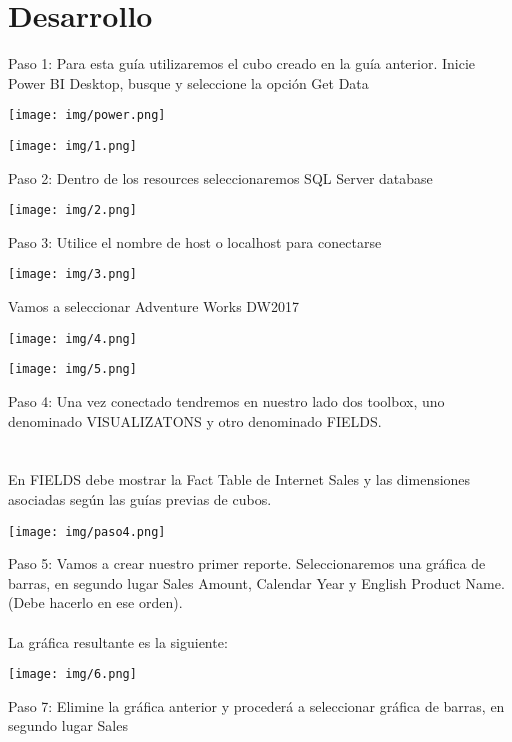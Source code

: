 \documentclass[12pt,letterpaper]{article}
\begin{document}
\section{Desarrollo}
Paso 1: Para esta guía utilizaremos el cubo creado en la guía anterior. Inicie Power BI Desktop, busque y
seleccione la opción Get Data
\begin{center}
    \texttt{[image: img/power.png]}  
\end{center}
\begin{center}
    \texttt{[image: img/1.png]}  
\end{center}
Paso 2: Dentro de los resources seleccionaremos SQL Server database
\begin{center}
    \texttt{[image: img/2.png]}  
\end{center}
Paso 3: Utilice el nombre de host o localhost para conectarse
\begin{center}
    \texttt{[image: img/3.png]}  
\end{center}
Vamos a seleccionar Adventure Works DW2017
\begin{center}
    \texttt{[image: img/4.png]}
    \vspace{2cm}  
\end{center}
\begin{center}
    \texttt{[image: img/5.png]}  
\end{center}
Paso 4: Una vez conectado tendremos en nuestro lado dos toolbox, uno denominado VISUALIZATONS y
otro denominado FIELDS.
\\\\\\En FIELDS debe mostrar la Fact Table de Internet Sales y las dimensiones asociadas según las guías
previas de cubos. 
\begin{center}
    \texttt{[image: img/paso4.png]}  
    \vspace{2cm}
\end{center}
Paso 5: Vamos a crear nuestro primer reporte. Seleccionaremos una gráfica de barras, en segundo lugar
Sales Amount, Calendar Year y English Product Name. (Debe hacerlo en ese orden).
\\\\La gráfica resultante es la siguiente:
\begin{center}
    \texttt{[image: img/6.png]}
    \vspace{2cm}  
\end{center}
Paso 7: Elimine la gráfica anterior y procederá a seleccionar gráfica de barras, en segundo lugar Sales
\end{document}
